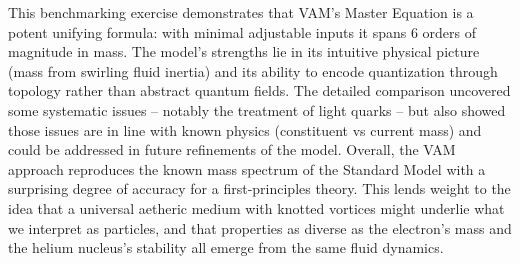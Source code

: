 This benchmarking exercise demonstrates that VAM’s Master Equation is a potent unifying formula: with minimal adjustable inputs it spans 6 orders of magnitude in mass. The model’s strengths lie in its intuitive physical picture (mass from swirling fluid inertia) and its ability to encode quantization through topology rather than abstract quantum fields. The detailed comparison uncovered some systematic issues – notably the treatment of light quarks – but also showed those issues are in line with known physics (constituent vs current mass) and could be addressed in future refinements of the model. Overall, the VAM approach reproduces the known mass spectrum of the Standard Model with a surprising degree of accuracy for a first-principles theory. This lends weight to the idea that a universal aetheric medium with knotted vortices might underlie what we interpret as particles, and that properties as diverse as the electron’s mass and the helium nucleus’s stability all emerge from the same fluid dynamics.